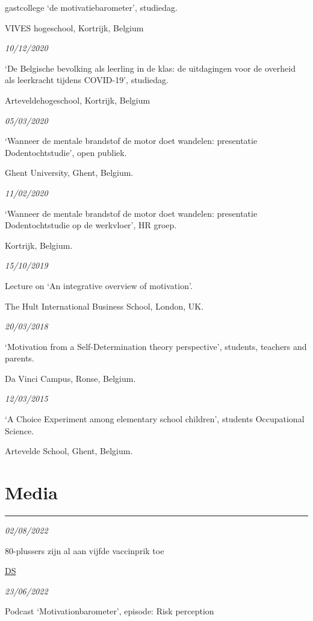 \documentclass[
]{article}
\begin{document}
gastcollege `de motivatiebarometer', studiedag.

VIVES hogeschool, Kortrijk, Belgium

\emph{10/12/2020}

`De Belgische bevolking als leerling in de klas: de uitdagingen voor de
overheid als leerkracht tijdens COVID-19', studiedag.

Arteveldehogeschool, Kortrijk, Belgium

\emph{05/03/2020}

`Wanneer de mentale brandstof de motor doet wandelen: presentatie
Dodentochtstudie', open publiek.

Ghent University, Ghent, Belgium.

\emph{11/02/2020}

`Wanneer de mentale brandstof de motor doet wandelen: presentatie
Dodentochtstudie op de werkvloer', HR groep.

Kortrijk, Belgium.

\emph{15/10/2019}

Lecture on `An integrative overview of motivation'.

The Hult International Business School, London, UK.

\emph{20/03/2018}

`Motivation from a Self-Determination theory perspective', students,
teachers and parents.

Da Vinci Campus, Ronse, Belgium.

\emph{12/03/2015}

`A Choice Experiment among elementary school children', students
Occupational Science.

Artevelde School, Ghent, Belgium.

\hypertarget{media}{%
\section{\texorpdfstring{Media }{Media }}\label{media}}

\begin{center}\rule{0.5\linewidth}{0.5pt}\end{center}

\emph{02/08/2022}

80-plussers zijn al aan vijfde vaccinprik toe

\href{download/press/covid/destand80.pdf}{DS }

\emph{23/06/2022}

Podcast `Motivationbarometer', episode: Risk perception
\end{document}
